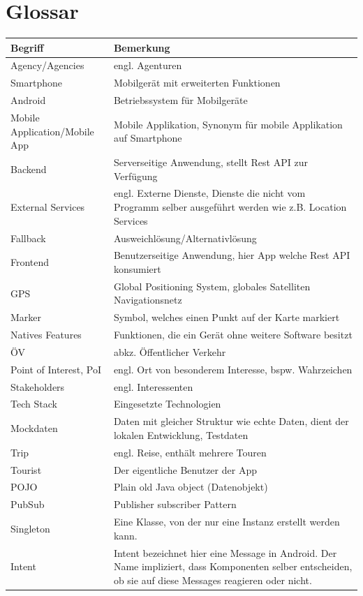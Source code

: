 \documentclass[a4paper,10pt,xetex]{article}
\begin{document}
\newpage
\section{Glossar}\label{glossar}
\begin{longtabu} to \textwidth { | l | X[l] | }
\hline
\textbf{Begriff} & \textbf{Bemerkung}\\\hline
\endhead

Agency/Agencies & engl. Agenturen\\\hline
Smartphone & Mobilgerät mit erweiterten Funktionen\\\hline
Android & Betriebssystem für Mobilgeräte\\\hline
Mobile Application/Mobile App & Mobile Applikation, Synonym für mobile Applikation auf Smartphone\\\hline
Backend & Serverseitige Anwendung, stellt Rest API zur Verfügung\\\hline
External Services & engl. Externe Dienste, Dienste die nicht vom Programm selber ausgeführt werden wie z.B. Location Services\\\hline
Fallback & Ausweichlösung/Alternativlösung\\\hline
Frontend & Benutzerseitige Anwendung, hier App welche Rest API konsumiert\\\hline
GPS & Global Positioning System, globales Satelliten Navigationsnetz\\\hline
Marker & Symbol, welches einen Punkt auf der Karte markiert\\\hline
Natives Features & Funktionen, die ein Gerät ohne weitere Software besitzt\\\hline
ÖV & abkz. Öffentlicher Verkehr\\\hline
Point of Interest, PoI & engl. Ort von besonderem Interesse, bspw. Wahrzeichen\\\hline
Stakeholders & engl. Interessenten\\\hline
Tech Stack & Eingesetzte Technologien\\\hline
Mockdaten & Daten mit gleicher Struktur wie echte Daten, dient der lokalen Entwicklung, Testdaten \\\hline
Trip & engl. Reise, enthält mehrere Touren\\\hline
Tourist & Der eigentliche Benutzer der App\\\hline
POJO & Plain old Java object (Datenobjekt)\\\hline
PubSub & Publisher subscriber Pattern\\\hline
Singleton & Eine Klasse, von der nur eine Instanz erstellt werden kann.\\\hline
Intent & Intent bezeichnet hier eine Message in Android. Der Name impliziert, dass
Komponenten selber entscheiden, ob sie auf diese Messages reagieren oder nicht.\\\hline
\end{longtabu}
\end{document}
